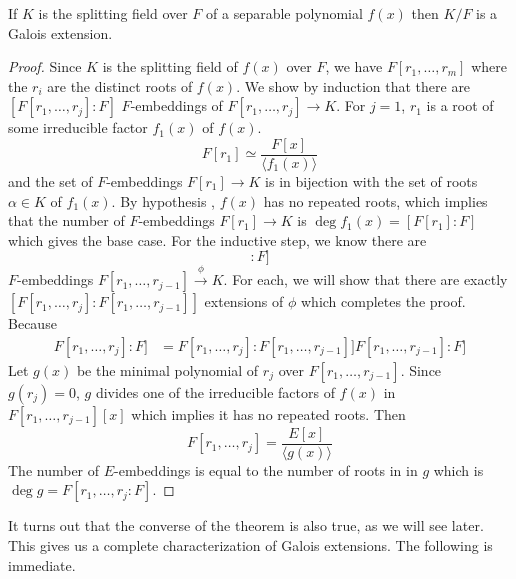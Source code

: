   \begin{theorem}
    \label{thm:splitting_separable}
    If $K$ is the splitting field over $F$ of a separable polynomial $f(x)$ then $K/F$ is a Galois extension. 
  \end{theorem}
  \begin{proof}
    Since $K$ is the splitting field of $f(x)$ over $F$, we have $F[r_1, \ldots, r_m]$ where the $r_i$ are the distinct roots of $f(x)$. We show by induction that there are $[F[r_1, \ldots, r_j]:F]$ $F$-embeddings of $F[r_1, \ldots, r_j] \to K$. For $j = 1$, $r_1$ is a root of some irreducible factor $f_1 (x)$ of $f(x)$. 
    \begin{equation}
      F[r_1] \simeq \frac{F[x]}{\langle f_1 (x) \rangle}
    \end{equation} 
    and the set of $F$-embeddings $F[r_1] \to K$ is in bijection with the set of roots $\alpha \in K$ of $f_1 (x)$. By hypothesis , $f(x)$ has no repeated roots, which implies that the number of $F$-embeddings $F[r_1] \to K$ is $\deg{f_1 (x)} = [F[r_1]: F]$ which gives the base case. For the inductive step, we know there are 
    \begin{equation}
      [F[r_1, \ldots, r_{j-1}]: F] 
    \end{equation}
    $F$-embeddings $F[r_1, \ldots, r_{j-1}] \xrightarrow{\phi} K$. For each, we will show that there are exactly $[F[r_1, \ldots, r_j]: F[r_1, \ldots, r_{j-1}]]$ extensions of $\phi$ which completes the proof. Because 
    \begin{align}
      F[r_1, \ldots, r_j]: F] & = F[r_1, \ldots, r_j]: F[r_1, \ldots, r_{j-1}]] F[r_1, \ldots, r_{j-1}]: F]
    \end{align} 
    Let $g(x)$ be the minimal polynomial of $r_j$ over $F[r_1, \ldots, r_{j-1}]$. Since $g(r_j) = 0$, $g$ divides one of the irreducible factors of $f(x)$ in $F[r_1, \ldots, r_{j-1}] [x]$ which implies it has no repeated roots. Then 
    \begin{equation}
      F[r_1, \ldots, r_j] = \frac{E[x]}{\langle g(x)\rangle} 
    \end{equation}
    The number of $E$-embeddings is equal to the number of roots in in $g$ which is $\deg{g} = F[r_1, \ldots, r_j: F]$.
  \end{proof} 

  It turns out that the converse of the theorem is also true, as we will see later. This gives us a complete characterization of Galois extensions. The following is immediate. 

